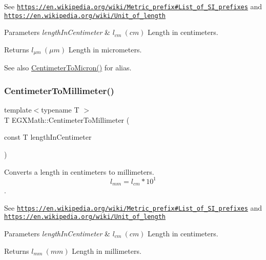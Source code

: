 See \href{https://en.wikipedia.org/wiki/Metric_prefix#List_of_SI_prefixes}{\tt https\+://en.\+wikipedia.\+org/wiki/\+Metric\+\_\+prefix\#\+List\+\_\+of\+\_\+\+S\+I\+\_\+prefixes} and \href{https://en.wikipedia.org/wiki/Unit_of_length}{\tt https\+://en.\+wikipedia.\+org/wiki/\+Unit\+\_\+of\+\_\+length} 
\begin{DoxyParams}{Parameters}
{\em length\+In\+Centimeter} & $ l_{cm}\ (cm)$ Length in centimeters. \\
\hline
\end{DoxyParams}
\begin{DoxyReturn}{Returns}
$ l_{\mu m}\ (\mu m)$ Length in micrometers. 
\end{DoxyReturn}
\begin{DoxySeeAlso}{See also}
\mbox{\hyperlink{group___e_g_x_math-_conversions-_length_conversions-_centimeter-_non-_s_i_gaee509ac676e86ed54994792f82dab9f7}{Centimeter\+To\+Micron()}} for alias. 
\end{DoxySeeAlso}
\mbox{\label{group___e_g_x_math-_conversions-_length_conversions-_centimeter-_s_i_ga3adaa50da05ec6ead83e93dbd9406ae0}} 
\subsubsection{\texorpdfstring{Centimeter\+To\+Millimeter()}{CentimeterToMillimeter()}}
{\footnotesize\ttfamily template$<$typename T $>$ \\
T E\+G\+X\+Math\+::\+Centimeter\+To\+Millimeter (\begin{DoxyParamCaption}\item[{const T}]{length\+In\+Centimeter }\end{DoxyParamCaption})}



Converts a length in centimeters to millimeters. \[ l_{mm}=l_{cm} * 10^{1} \]. 

See \href{https://en.wikipedia.org/wiki/Metric_prefix#List_of_SI_prefixes}{\tt https\+://en.\+wikipedia.\+org/wiki/\+Metric\+\_\+prefix\#\+List\+\_\+of\+\_\+\+S\+I\+\_\+prefixes} and \href{https://en.wikipedia.org/wiki/Unit_of_length}{\tt https\+://en.\+wikipedia.\+org/wiki/\+Unit\+\_\+of\+\_\+length} 
\begin{DoxyParams}{Parameters}
{\em length\+In\+Centimeter} & $ l_{cm}\ (cm)$ Length in centimeters. \\
\hline
\end{DoxyParams}
\begin{DoxyReturn}{Returns}
$ l_{mm}\ (mm)$ Length in millimeters. 
\end{DoxyReturn}
\mbox{\label{group___e_g_x_math-_conversions-_length_conversions-_centimeter-_s_i_gacf80778df778af3266027dbe32bfd2d4}} 

